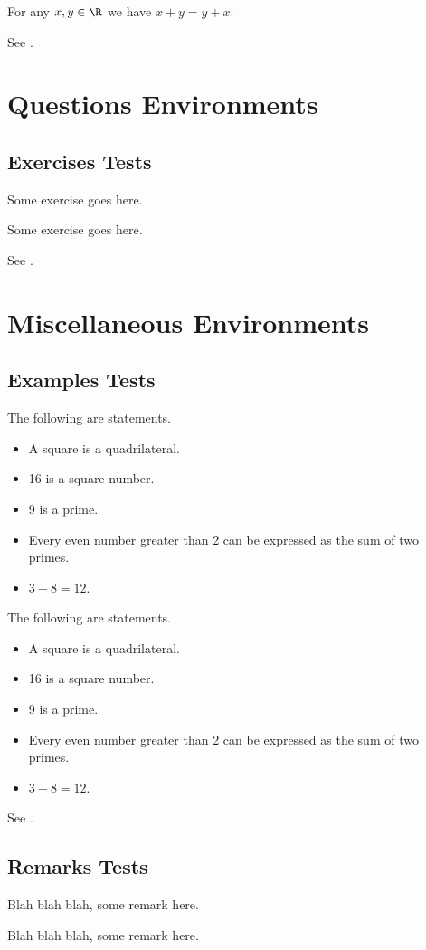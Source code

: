 \begin{axiom}\label{axiom:test}
    For any $x, y \in \R$ we have $x + y = y + x$.
\end{axiom}

See .

\section*{Questions Environments}
\subsection*{Exercises Tests}
\begin{exercise}
    Some exercise goes here.
\end{exercise}

\begin{exercise}\label{exercise:test}
    Some exercise goes here.
\end{exercise}

See .

\section*{Miscellaneous Environments}
\subsection*{Examples Tests}
\begin{example}
    The following are statements.
    \begin{itemize}
        \item A square is a quadrilateral.
        \item 16 is a square number.
        \item 9 is a prime.
        \item Every even number greater than 2 can be expressed as the sum of two primes.
        \item $3 + 8 = 12$.
    \end{itemize}
\end{example}

\begin{example}[Statements]\label{example:test}
    The following are statements.
    \begin{itemize}
        \item A square is a quadrilateral.
        \item 16 is a square number.
        \item 9 is a prime.
        \item Every even number greater than 2 can be expressed as the sum of two primes.
        \item $3 + 8 = 12$.
    \end{itemize}
\end{example}

See .

\subsection*{Remarks Tests}
\begin{remark}
    Blah blah blah, some remark here.
\end{remark}

\begin{remark}[A Remark]
    Blah blah blah, some remark here.
\end{remark}
